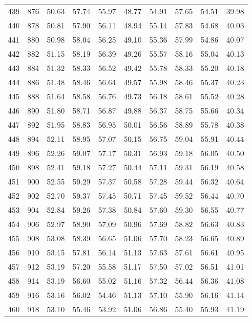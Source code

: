 \begin{longtable}{rrllllllll}
		439 & 876 & 50.63 & 57.74 & 55.97 & 48.77 & 54.91 & 57.65 & 54.51 & 39.98 \\ 
		440 & 878 & 50.81 & 57.90 & 56.11 & 48.94 & 55.14 & 57.83 & 54.68 & 40.03 \\ 
		441 & 880 & 50.98 & 58.04 & 56.25 & 49.10 & 55.36 & 57.99 & 54.86 & 40.07 \\ 
		442 & 882 & 51.15 & 58.19 & 56.39 & 49.26 & 55.57 & 58.16 & 55.04 & 40.13 \\ 
		443 & 884 & 51.32 & 58.33 & 56.52 & 49.42 & 55.78 & 58.33 & 55.20 & 40.18 \\ 
		444 & 886 & 51.48 & 58.46 & 56.64 & 49.57 & 55.98 & 58.46 & 55.37 & 40.23 \\ 
		445 & 888 & 51.64 & 58.58 & 56.76 & 49.73 & 56.18 & 58.61 & 55.52 & 40.28 \\ 
		446 & 890 & 51.80 & 58.71 & 56.87 & 49.88 & 56.37 & 58.75 & 55.66 & 40.34 \\ 
		447 & 892 & 51.95 & 58.83 & 56.95 & 50.01 & 56.56 & 58.89 & 55.78 & 40.38 \\ 
		448 & 894 & 52.11 & 58.95 & 57.07 & 50.15 & 56.75 & 59.04 & 55.91 & 40.44 \\ 
		449 & 896 & 52.26 & 59.07 & 57.17 & 50.31 & 56.93 & 59.18 & 56.05 & 40.50 \\ 
		450 & 898 & 52.41 & 59.18 & 57.27 & 50.44 & 57.11 & 59.31 & 56.19 & 40.58 \\ 
		451 & 900 & 52.55 & 59.29 & 57.37 & 50.58 & 57.28 & 59.44 & 56.32 & 40.64 \\ 
		452 & 902 & 52.70 & 59.37 & 57.45 & 50.71 & 57.45 & 59.52 & 56.44 & 40.70 \\ 
		453 & 904 & 52.84 & 59.26 & 57.38 & 50.84 & 57.60 & 59.30 & 56.55 & 40.77 \\ 
		454 & 906 & 52.97 & 58.90 & 57.09 & 50.96 & 57.69 & 58.82 & 56.63 & 40.83 \\ 
		455 & 908 & 53.08 & 58.39 & 56.65 & 51.06 & 57.70 & 58.23 & 56.65 & 40.89 \\ 
		456 & 910 & 53.15 & 57.81 & 56.14 & 51.13 & 57.63 & 57.61 & 56.61 & 40.95 \\ 
		457 & 912 & 53.19 & 57.20 & 55.58 & 51.17 & 57.50 & 57.02 & 56.51 & 41.01 \\ 
		458 & 914 & 53.19 & 56.60 & 55.02 & 51.16 & 57.32 & 56.44 & 56.36 & 41.08 \\ 
		459 & 916 & 53.16 & 56.02 & 54.46 & 51.13 & 57.10 & 55.90 & 56.16 & 41.14 \\ 
		460 & 918 & 53.10 & 55.46 & 53.92 & 51.06 & 56.86 & 55.40 & 55.93 & 41.19 \\ 

\end{longtable}
